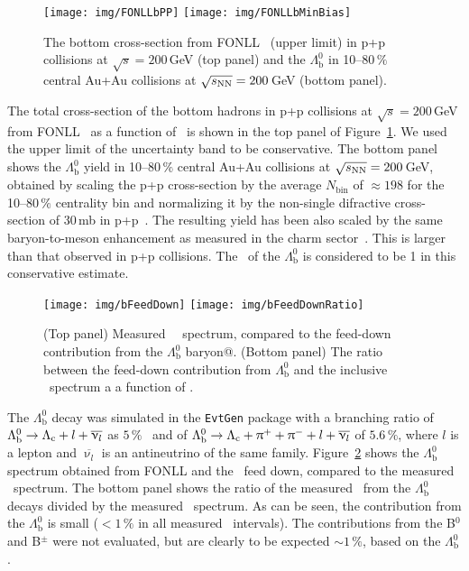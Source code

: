 \begin{figure}[!htb]
\centering
\texttt{[image: img/FONLLbPP]}
\texttt{[image: img/FONLLbMinBias]}
\caption{\label{FONLLb} The bottom cross-section from FONLL~\cite{FONLLcharm} (upper limit) in p+p collisions at $\sqrt{s} = 200\,$GeV (top panel) and the $\Lambda_\mathrm{b}^0$ in 10--80$\,\%$ central Au+Au collisions at $\sqrt{s_\text{NN}} = 200\,$GeV (bottom panel)\@.}
\end{figure}


The total cross-section of the bottom hadrons in p+p collisions at $\sqrt{s} = 200\,$GeV from FONLL~\cite{FONLLcharm} as a function of \pt\ is shown in the top panel of Figure~\ref{FONLLb}\@. We used the upper limit of the uncertainty band to be conservative. The bottom panel shows the $\Lambda_\mathrm{b}^0$ yield in 10--80$\,\%$ central Au+Au collisions at $\sqrt{s_\text{NN}} = 200\,$GeV, obtained by scaling the p+p cross-section by the average $N_\mathrm{bin}$ of $\approx 198$ for the 10--80$\,\%$ centrality bin and normalizing it by the non-single difractive cross-section of 30$\,$mb in p+p~\cite{ppCrossSection}\@. The resulting yield has been also scaled by the same baryon-to-meson enhancement as measured in the charm sector~\cite{baryonToMesonEnhancementSequentially}\@. This is larger than that observed in p+p collisions. The \Raa\ of the $\Lambda_\mathrm{b}^0$ is considered to be 1 in this conservative estimate.

\begin{figure}[!htb]
\centering
\texttt{[image: img/bFeedDown]}
\texttt{[image: img/bFeedDownRatio]}
\caption{\label{bFeedDown} (Top panel) Measured \Lambdacpm\ \pt\ spectrum, compared to the feed-down contribution from the $\Lambda_\mathrm{b}^0$ baryon@. (Bottom panel) The ratio between the feed-down contribution from $\Lambda_\mathrm{b}^0$ and the inclusive \Lambdacpm\ spectrum a a function of \pt.}
\end{figure}

The $\Lambda_\mathrm{b}^0$ decay was simulated in the \texttt{EvtGen} package with a branching ratio of $\Lambda_\mathrm{b}^0 \rightarrow {\Lambda_\text{c}} + l + \overline{\upnu_l}$ as $5\,\%$~\cite{PDG} and of $\Lambda_\mathrm{b}^0 \rightarrow {\Lambda_\text{c}} + \uppi^+ + \uppi^- + l + \overline{\upnu_l}$ of $5.6\,\%$, where $l$ is a lepton and $\overline{\upnu_l}$ is an antineutrino of the same family. Figure~\ref{bFeedDown} shows the $\Lambda_\mathrm{b}^0$ spectrum obtained from FONLL and the \Lambdac\ feed down, compared to the measured \Lambdac\ spectrum. The bottom panel shows the ratio of the measured \Lambdac\ from the  $\Lambda_\mathrm{b}^0$ decays divided by the measured \pt\ spectrum. As can be seen, the contribution  from the $\Lambda_\mathrm{b}^0$ is small ($< 1\,\%$ in all measured \pt\ intervals)\@. The contributions from the B$^0$ and B$^\pm$ were not evaluated, but are clearly to be expected $\sim1\,\%$, based on the $\Lambda_\mathrm{b}^0$\@.

